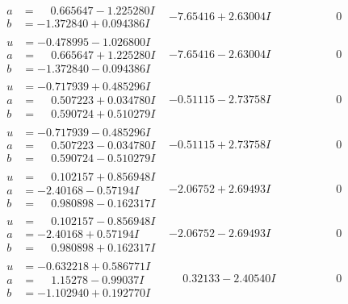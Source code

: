 \documentclass[1p]{elsarticle_modified}
\theoremstyle{definition}
\begin{document}
$$\begin{array}{c|c|c}
\begin{aligned}
a &= \phantom{-}0.665647 - 1.225280 I \\
b &= -1.372840 + 0.094386 I\end{aligned}
 & -7.65416 + 2.63004 I & \phantom{-0.000000 } 0 \\ \hline\begin{aligned}
u &= -0.478995 - 1.026800 I \\
a &= \phantom{-}0.665647 + 1.225280 I \\
b &= -1.372840 - 0.094386 I\end{aligned}
 & -7.65416 - 2.63004 I & \phantom{-0.000000 } 0 \\ \hline\begin{aligned}
u &= -0.717939 + 0.485296 I \\
a &= \phantom{-}0.507223 + 0.034780 I \\
b &= \phantom{-}0.590724 + 0.510279 I\end{aligned}
 & -0.51115 - 2.73758 I & \phantom{-0.000000 } 0 \\ \hline\begin{aligned}
u &= -0.717939 - 0.485296 I \\
a &= \phantom{-}0.507223 - 0.034780 I \\
b &= \phantom{-}0.590724 - 0.510279 I\end{aligned}
 & -0.51115 + 2.73758 I & \phantom{-0.000000 } 0 \\ \hline\begin{aligned}
u &= \phantom{-}0.102157 + 0.856948 I \\
a &= -2.40168 - 0.57194 I \\
b &= \phantom{-}0.980898 - 0.162317 I\end{aligned}
 & -2.06752 + 2.69493 I & \phantom{-0.000000 } 0 \\ \hline\begin{aligned}
u &= \phantom{-}0.102157 - 0.856948 I \\
a &= -2.40168 + 0.57194 I \\
b &= \phantom{-}0.980898 + 0.162317 I\end{aligned}
 & -2.06752 - 2.69493 I & \phantom{-0.000000 } 0 \\ \hline\begin{aligned}
u &= -0.632218 + 0.586771 I \\
a &= \phantom{-}1.15278 - 0.99037 I \\
b &= -1.102940 + 0.192770 I\end{aligned}
 & \phantom{-}0.32133 - 2.40540 I & \phantom{-0.000000 } 0 \\ \hline\begin{aligned}

\end{aligned}
\end{array}$$
\end{document}

